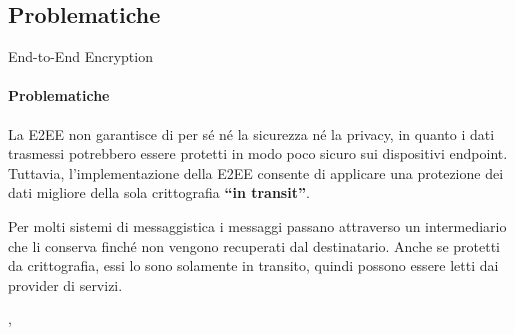 \subsection{Problematiche}

\begin{frame}{End-to-End Encryption}
    \framesubtitle{Problematiche}

    La E2EE non garantisce di per sé né la sicurezza né la privacy, in quanto i dati trasmessi potrebbero essere protetti in modo poco sicuro sui dispositivi endpoint.\newline
    Tuttavia, l'implementazione della E2EE consente di applicare una protezione dei dati migliore della sola crittografia \textbf{``in transit''}.\newline\pause

    Per molti sistemi di messaggistica i messaggi passano attraverso un intermediario che li conserva finché non vengono recuperati dal destinatario. Anche se protetti da crittografia, essi lo sono solamente in transito, quindi possono essere letti dai provider di servizi. 

    \cite{intransitEncryption}, \cite{IBM}

\end{frame}

